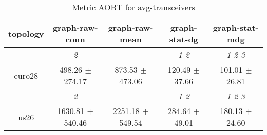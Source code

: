 \begin{table}[h]
\caption{Metric AOBT for avg-transceivers}

        \centering
        \begin{tabular}{
        ccccc} \toprule 
 topology& graph-raw-conn & graph-raw-mean & graph-stat-dg & graph-stat-mdg \\ \toprule
 & \cellcolor[HTML]{EFEFEF} \textit{ 2 }& \cellcolor[HTML]{EFEFEF} & \cellcolor[HTML]{EFEFEF} \textit{ 1 2 }& \cellcolor[HTML]{EFEFEF} \textit{ 1 2 3 } \\ 
 {euro28}& \cellcolor[HTML]{EFEFEF} 498.26 $\pm$ 274.17& \cellcolor[HTML]{EFEFEF} 873.53 $\pm$ 473.06& \cellcolor[HTML]{EFEFEF} 120.49 $\pm$ 37.66& \cellcolor[HTML]{EFEFEF} 101.01 $\pm$ 26.81 \\ 
& \cellcolor[HTML]{EFEFEF} \textit{ 2 }& \cellcolor[HTML]{EFEFEF} & \cellcolor[HTML]{EFEFEF} \textit{ 1 2 }& \cellcolor[HTML]{EFEFEF} \textit{ 1 2 3 } \\ 
 {us26}& \cellcolor[HTML]{EFEFEF} 1630.81 $\pm$ 540.46& \cellcolor[HTML]{EFEFEF} 2251.18 $\pm$ 549.54& \cellcolor[HTML]{EFEFEF} 284.64 $\pm$ 49.01& \cellcolor[HTML]{EFEFEF} 180.13 $\pm$ 24.60 \\ 

        \bottomrule
        \end{tabular}%

        \end{table}
        
